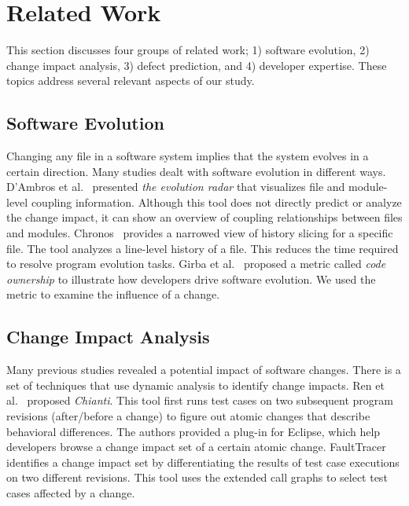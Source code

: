 \section{Related Work}
\label{sec:related}

This section discusses four groups of related work; 1) software evolution, 2)
change impact analysis, 3) defect prediction, and 4) developer expertise. These
topics address several relevant aspects of our study.

\subsection{Software Evolution}
Changing any file in a software system implies that the system evolves in a
certain direction. Many studies dealt with software evolution in different ways.
D'Ambros et al.~\cite{dambros_evolution_2006} presented \emph{the evolution
radar} that visualizes file and module-level coupling information. Although this
tool does not directly predict or analyze the change impact, it can show an
overview of coupling relationships between files and modules.
Chronos~\cite{servant_history_2012} provides a narrowed view of history
slicing for a specific file. The tool analyzes a line-level history of a file.
This reduces the time required to resolve program evolution tasks. Girba et
al.~\cite{girba_how_2005} proposed a metric called \emph{code ownership} to
illustrate how developers drive software evolution. We used the metric to
examine the influence of a change.


\subsection{Change Impact Analysis}


Many previous studies revealed a potential impact of software changes. There is a
set of techniques that use dynamic analysis to identify change impacts. Ren et
al.~\cite{ren_chianti:_2004} proposed \emph{Chianti}. This tool first runs test
cases on two subsequent program revisions (after/before a change) to figure out
atomic changes that describe behavioral differences. The authors provided a
plug-in for Eclipse, which help developers browse a change impact set of a
certain atomic change. FaultTracer~\cite{zhang_faulttracer:_2012} identifies
a change impact set by differentiating the results of test case executions on
two different revisions. This tool uses the extended call graphs to select
test cases affected by a change.


